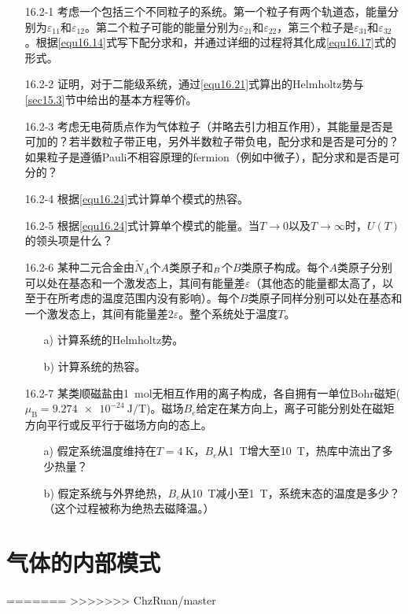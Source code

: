 \begin{itemize}
\item[16.2-1] 考虑一个包括三个不同粒子的系统。第一个粒子有两个轨道态，能量分别为$\varepsilon_{11}$和$\varepsilon_{12}$。第二个粒子可能的能量分别为$\varepsilon_{21}$和$\varepsilon_{22}$，第三个粒子是$\varepsilon_{31}$和$\varepsilon_{32}$。根据\eqref{equ16.14}式写下配分求和，并通过详细的过程将其化成\eqref{equ16.17}式的形式。
\item[16.2-2] 证明，对于二能级系统，通过\eqref{equ16.21}式算出的Helmholtz势与\ref{sec15.3}节中给出的基本方程等价。 
\item[16.2-3] 考虑无电荷质点作为气体粒子（并略去引力相互作用），其能量是否是可加的？若半数粒子带正电，另外半数粒子带负电，配分求和是否是可分的？如果粒子是遵循Pauli不相容原理的fermion（例如中微子），配分求和是否是可分的？
\item[16.2-4] 根据\eqref{equ16.24}式计算单个模式的热容。
\item[16.2-5] 根据\eqref{equ16.24}式计算单个模式的能量。当$T\rightarrow 0$以及$T\rightarrow \infty$时，$U(T)$的领头项是什么？
\item[16.2-6] 某种二元合金由$\tilde N_A$个$A$类原子和$\title N_B$个$B$类原子构成。每个$A$类原子分别可以处在基态和一个激发态上，其间有能量差$\varepsilon$（其他态的能量都太高了，以至于在所考虑的温度范围内没有影响）。每个$B$类原子同样分别可以处在基态和一个激发态上，其间有能量差$2\varepsilon$。整个系统处于温度$T$。
	\begin{itemize}
	\item[a)] 计算系统的Helmholtz势。
	\item[b)] 计算系统的热容。
	\end{itemize}
\item[16.2-7] 某类顺磁盐由\SI{1}{\mole}无相互作用的离子构成，各自拥有一单位Bohr磁矩($\mu_\text{B}=\SI{9.274e-24}{\joule\per\tesla}$)。磁场$B_e$给定在某方向上，离子可能分别处在磁矩方向平行或反平行于磁场方向的态上。
	\begin{itemize}
	\item[a)] 假定系统温度维持在$T=\SI{4}{\kelvin}$，$B_e$从\SI{1}{\tesla}增大至\SI{10}{\tesla}，热库中流出了多少热量？
	\item[b)] 假定系统与外界绝热，$B_e$从\SI{10}{\tesla}减小至\SI{1}{\tesla}，系统末态的温度是多少？（这个过程被称为绝热去磁降温。）
	\end{itemize}
\end{itemize}

\section{气体的内部模式}\label{sec16.3}
=======
>>>>>>> ChzRuan/master
